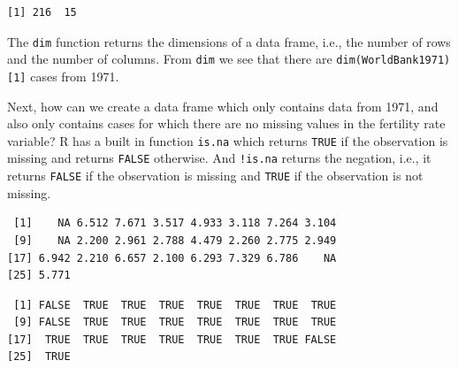 \documentclass[
]{krantz}
\makeatletter
\newenvironment{Shaded}{\begin{snugshade}}{\end{snugshade}}
\newcommand{\DecValTok}[1]{\textcolor[rgb]{0.06,0.06,0.06}{#1}}
\newcommand{\KeywordTok}[1]{\textcolor[rgb]{0.27,0.27,0.27}{\textbf{#1}}}
\newcommand{\NormalTok}[1]{#1}
\newcommand{\OperatorTok}[1]{\textcolor[rgb]{0.43,0.43,0.43}{\textbf{#1}}}
\newcommand{\StringTok}[1]{\textcolor[rgb]{0.5,0.5,0.5}{#1}}
\newenvironment{kframe}{%
\medskip{}
\setlength{\fboxsep}{.8em}
 \def\at@end@of@kframe{}%
 \ifinner\ifhmode%
  \def\at@end@of@kframe{\end{minipage}}%
  \begin{minipage}{\columnwidth}%
 \fi\fi%
 \def\FrameCommand##1{\hskip\@totalleftmargin \hskip-\fboxsep
 \colorbox{shadecolor}{##1}\hskip-\fboxsep
     \hskip-\linewidth \hskip-\@totalleftmargin \hskip\columnwidth}%
 \MakeFramed {\advance\hsize-\width
   \@totalleftmargin\z@ \linewidth\hsize
   \@setminipage}}%
 {\par\unskip\endMakeFramed%
 \at@end@of@kframe}
\renewenvironment{Shaded}{\begin{kframe}}{\end{kframe}}
\makeatother
\begin{document}
\begin{Shaded}
\end{Shaded}

\begin{verbatim}
[1] 216  15
\end{verbatim}

The \texttt{dim} function returns the dimensions of a data frame, i.e., the number of rows and the number of columns. From \texttt{dim} we see that there are \texttt{dim(WorldBank1971){[}1{]}} cases from 1971.

Next, how can we create a data frame which only contains data from 1971, and also only contains cases for which there are no missing values in the fertility rate variable? R has a built in function \texttt{is.na} which returns \texttt{TRUE} if the observation is missing and returns \texttt{FALSE} otherwise. And \texttt{!is.na} returns the negation, i.e., it returns \texttt{FALSE} if the observation is missing and \texttt{TRUE} if the observation is not missing.

\begin{Shaded}
\end{Shaded}

\begin{verbatim}
 [1]    NA 6.512 7.671 3.517 4.933 3.118 7.264 3.104
 [9]    NA 2.200 2.961 2.788 4.479 2.260 2.775 2.949
[17] 6.942 2.210 6.657 2.100 6.293 7.329 6.786    NA
[25] 5.771
\end{verbatim}

\begin{Shaded}
\end{Shaded}

\begin{verbatim}
 [1] FALSE  TRUE  TRUE  TRUE  TRUE  TRUE  TRUE  TRUE
 [9] FALSE  TRUE  TRUE  TRUE  TRUE  TRUE  TRUE  TRUE
[17]  TRUE  TRUE  TRUE  TRUE  TRUE  TRUE  TRUE FALSE
[25]  TRUE
\end{verbatim}
\end{document}
